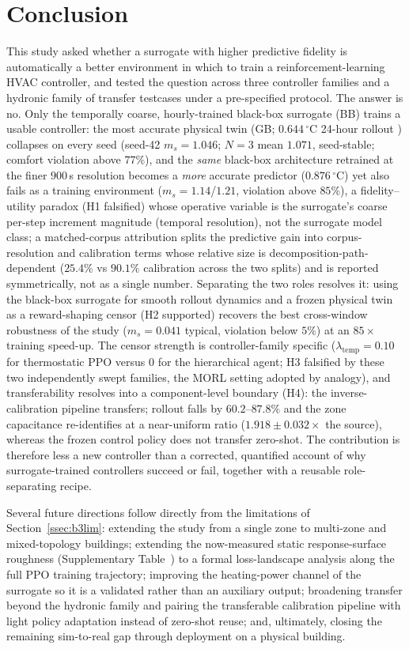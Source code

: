 \section{Conclusion}\label{sec:conclusion}
This study asked whether a surrogate with higher predictive fidelity is automatically a
better environment in which to train a reinforcement-learning HVAC controller, and
tested the question across three controller families and a hydronic family of
transfer testcases under a pre-specified protocol. The answer is
no. Only the temporally coarse, hourly-trained black-box surrogate (BB) trains a
usable controller: the most accurate physical twin (GB; $0.644\,^{\circ}$C 24-hour
rollout \RMSE) collapses on every seed (seed-42 $m_s = 1.046$; $N=3$ mean $1.071$, seed-stable; comfort violation above $77\%$), and the
\emph{same} black-box architecture retrained at the finer $900$\,s resolution becomes
a \emph{more} accurate predictor ($0.876\,^{\circ}$C) yet also fails as a training
environment ($m_s = 1.14$/$1.21$, violation above $85\%$), a fidelity--utility
paradox (H1 falsified) whose operative variable is the surrogate's coarse per-step
increment magnitude (temporal resolution), not the surrogate model class; a matched-corpus
attribution splits the predictive gain into corpus-resolution and calibration terms whose
relative size is decomposition-path-dependent ($25.4\%$ vs $90.1\%$ calibration across the two splits) and is reported symmetrically, not as a single number. Separating the two roles resolves it: using the
black-box surrogate for smooth rollout dynamics and a frozen physical twin as a
reward-shaping censor (H2 supported) recovers the best cross-window robustness of the
study ($m_s = 0.041$ typical, violation below $5\%$) at an $85\times$ training
speed-up. The censor strength is controller-family specific
($\lambda_{\mathrm{temp}}=0.10$ for thermostatic PPO versus $0$ for the hierarchical
agent; H3 falsified by these two independently swept families, the MORL setting adopted by analogy), and transferability resolves into a component-level
boundary (H4): the inverse-calibration pipeline transfers; rollout \RMSE{} falls
by $60.2$--$87.8\%$ and the zone capacitance re-identifies at a near-uniform
ratio ($1.918\pm0.032\times$ the source), whereas the frozen control policy
does not transfer zero-shot. The contribution is therefore less a new controller
than a corrected, quantified account of why surrogate-trained controllers succeed
or fail, together with a reusable role-separating recipe.

Several future directions follow directly from the limitations of
Section~\ref{ssec:b3lim}: extending the study from a single zone to multi-zone and
mixed-topology buildings; extending the now-measured static response-surface
roughness (Supplementary Table~) to a formal loss-landscape analysis
along the full PPO training trajectory;
improving the heating-power channel of the surrogate so it is a validated rather
than an auxiliary output; broadening transfer beyond the hydronic family and
pairing the transferable calibration pipeline with light policy adaptation instead
of zero-shot reuse; and, ultimately, closing the remaining sim-to-real gap through
deployment on a physical building.

